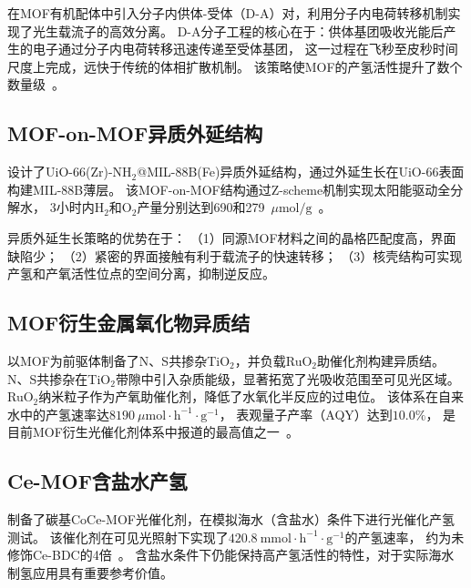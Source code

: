 \citet{yan2023donor_acceptor_mof}在MOF有机配体中引入分子内供体-受体（D-A）对，利用分子内电荷转移机制实现了光生载流子的高效分离。 %
D-A分子工程的核心在于：供体基团吸收光能后产生的电子通过分子内电荷转移迅速传递至受体基团，
这一过程在飞秒至皮秒时间尺度上完成，远快于传统的体相扩散机制。
该策略使MOF的产氢活性提升了数个数量级~\citep{yan2023donor_acceptor_mof}。 %


\subsection{MOF-on-MOF异质外延结构}

\citet{uio66_mil88b_2024}设计了UiO-66(Zr)-NH$_2$@MIL-88B(Fe)异质外延结构，通过外延生长在UiO-66表面构建MIL-88B薄层。 %
该MOF-on-MOF结构通过Z-scheme机制实现太阳能驱动全分解水，
3小时内H$_2$和O$_2$产量分别达到690和279~$\mu\mathrm{mol/g}$~\citep{uio66_mil88b_2024}。 %

异质外延生长策略的优势在于：
（1）同源MOF材料之间的晶格匹配度高，界面缺陷少；
（2）紧密的界面接触有利于载流子的快速转移；
（3）核壳结构可实现产氢和产氧活性位点的空间分离，抑制逆反应。


\subsection{MOF衍生金属氧化物异质结}

\citet{rtta2024heterojunction}以MOF为前驱体制备了N、S共掺杂TiO$_2$，并负载RuO$_2$助催化剂构建异质结。 %
N、S共掺杂在TiO$_2$带隙中引入杂质能级，显著拓宽了光吸收范围至可见光区域。
RuO$_2$纳米粒子作为产氧助催化剂，降低了水氧化半反应的过电位。
该体系在自来水中的产氢速率达$8190~\mu\mathrm{mol \cdot h^{-1} \cdot g^{-1}}$，
表观量子产率（AQY）达到$10.0\%$，
是目前MOF衍生光催化剂体系中报道的最高值之一~\citep{rtta2024heterojunction}。 %


\subsection{Ce-MOF含盐水产氢}

\citet{coce_mof_2025}制备了碳基CoCe-MOF光催化剂，在模拟海水（含盐水）条件下进行光催化产氢测试。 %
该催化剂在可见光照射下实现了$420.8~\mathrm{mmol \cdot h^{-1} \cdot g^{-1}}$的产氢速率，
约为未修饰Ce-BDC的4倍~\citep{coce_mof_2025}。 %
含盐水条件下仍能保持高产氢活性的特性，对于实际海水制氢应用具有重要参考价值。

